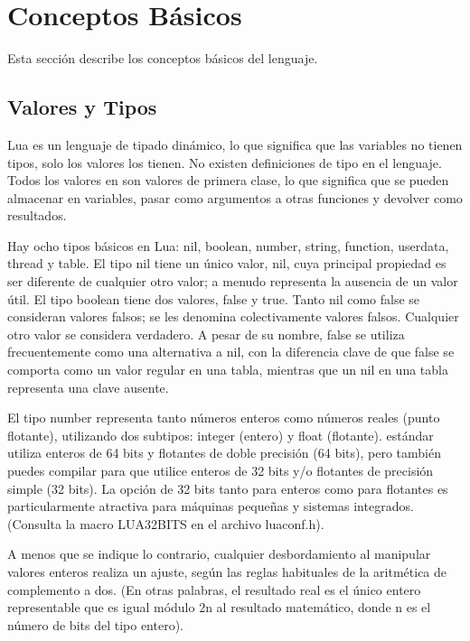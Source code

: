 
\chapter{Conceptos Básicos}
Esta sección describe los conceptos básicos del lenguaje.

\section{Valores y Tipos}
Lua es un lenguaje de tipado dinámico, lo que significa que las variables no tienen tipos, solo los valores los tienen. No existen definiciones de tipo en el lenguaje. Todos los valores en  son valores de primera clase, lo que significa que se pueden almacenar en variables, pasar como argumentos a otras funciones y devolver como resultados.

Hay ocho tipos básicos en Lua: nil, boolean, number, string, function, userdata, thread y table. El tipo nil tiene un único valor, nil, cuya principal propiedad es ser diferente de cualquier otro valor; a menudo representa la ausencia de un valor útil. El tipo boolean tiene dos valores, false y true. Tanto nil como false se consideran valores falsos; se les denomina colectivamente valores falsos. Cualquier otro valor se considera verdadero. A pesar de su nombre, false se utiliza frecuentemente como una alternativa a nil, con la diferencia clave de que false se comporta como un valor regular en una tabla, mientras que un nil en una tabla representa una clave ausente.

El tipo number representa tanto números enteros como números reales (punto flotante), utilizando dos subtipos: integer (entero) y float (flotante).  estándar utiliza enteros de 64 bits y flotantes de doble precisión (64 bits), pero también puedes compilar  para que utilice enteros de 32 bits y/o flotantes de precisión simple (32 bits). La opción de 32 bits tanto para enteros como para flotantes es particularmente atractiva para máquinas pequeñas y sistemas integrados. (Consulta la macro LUA32BITS en el archivo luaconf.h).

A menos que se indique lo contrario, cualquier desbordamiento al manipular valores enteros realiza un ajuste, según las reglas habituales de la aritmética de complemento a dos. (En otras palabras, el resultado real es el único entero representable que es igual módulo 2n al resultado matemático, donde n es el número de bits del tipo entero).

